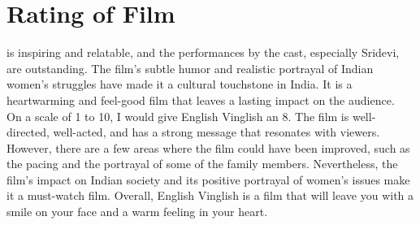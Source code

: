 \documentclass[11pt]{article}
\begin{document}
\section{Rating of Film}
is inspiring and relatable, and the performances by the cast, especially Sridevi, are outstanding. The film's subtle humor and realistic portrayal of Indian women's struggles have made it a cultural touchstone in India. It is a heartwarming and feel-good film that leaves a lasting impact on the audience.\\

On a scale of 1 to 10, I would give English Vinglish an 8. The film is well-directed, well-acted, and has a strong message that resonates with viewers. However, there are a few areas where the film could have been improved, such as the pacing and the portrayal of some of the family members. Nevertheless, the film's impact on Indian society and its positive portrayal of women's issues make it a must-watch film. Overall, English Vinglish is a film that will leave you with a smile on your face and a warm feeling in your heart.
\end{document}

